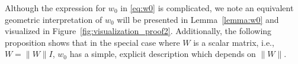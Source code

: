 \documentclass[11pt]{article}
\newtheorem{proposition}[theorem]{Proposition}
\begin{document}
{%
%
%




Although the expression for $w_0$ in \eqref{eq:w0} is complicated, we note an equivalent geometric interpretation of $w_0$ will be presented in Lemma~\ref{lemma:w0} and visualized in Figure~\ref{fig:visualization_proof2}. Additionally, the following proposition shows that in the special case where $W$ is a scalar matrix, i.e., $W= \|W\|I$, $w_0$ has a simple, explicit description which depends on $\|W\|$.
}
\end{document}

